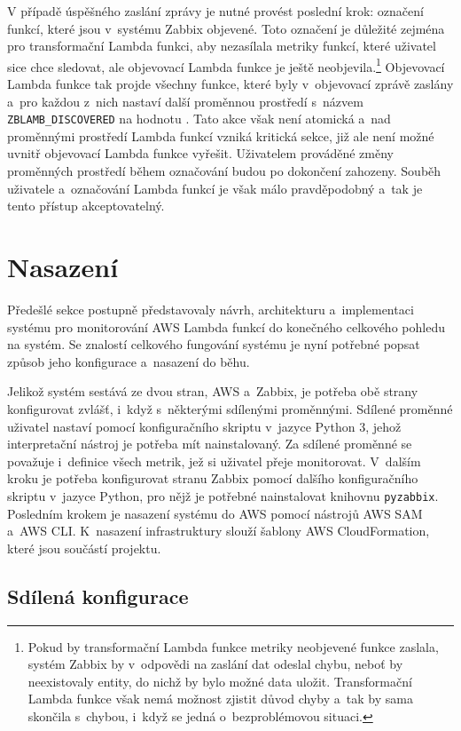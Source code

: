 \documentclass[czech, ing, kiv, he, iso690]{fasthesis}
\begin{document}
V případě úspěšného zaslání zprávy je nutné provést poslední krok: označení funkcí, které jsou v~systému Zabbix objevené. Toto označení je důležité zejména pro transformační Lambda funkci, aby nezasílala metriky funkcí, které uživatel sice chce sledovat, ale objevovací Lambda funkce je ještě neobjevila.\footnote{Pokud by transformační Lambda funkce metriky neobjevené funkce zaslala, systém Zabbix by v~odpovědi na zaslání dat odeslal chybu, neboť by neexistovaly entity, do nichž by bylo možné data uložit. Transformační Lambda funkce však nemá možnost zjistit důvod chyby a~tak by sama skončila s~chybou, i~když se jedná o~bezproblémovou situaci.} Objevovací Lambda funkce tak projde všechny funkce, které byly v~objevovací zprávě zaslány a~pro každou z~nich nastaví další proměnnou prostředí s~názvem \verb|ZBLAMB_DISCOVERED| na hodnotu . Tato akce však není atomická a~nad proměnnými prostředí Lambda funkcí vzniká kritická sekce, již ale není možné uvnitř objevovací Lambda funkce vyřešit. Uživatelem prováděné změny proměnných prostředí během označování budou po dokončení zahozeny. Souběh uživatele a~označování Lambda funkcí je však málo pravděpodobný a~tak je tento přístup akceptovatelný.

\section{Nasazení}
Předešlé sekce postupně představovaly návrh, architekturu a~implementaci systému pro monitorování AWS Lambda funkcí do konečného celkového pohledu na systém. Se znalostí celkového fungování systému je nyní potřebné popsat způsob jeho konfigurace a~nasazení do běhu.

Jelikož systém sestává ze dvou stran, AWS a~Zabbix, je potřeba obě strany konfigurovat zvlášť, i~když s~některými sdílenými proměnnými. Sdílené proměnné uživatel nastaví pomocí konfiguračního skriptu v~jazyce Python 3, jehož interpretační nástroj je potřeba mít nainstalovaný. Za sdílené proměnné se považuje i~definice všech metrik, jež si uživatel přeje monitorovat. V~dalším kroku je potřeba konfigurovat stranu Zabbix pomocí dalšího konfiguračního skriptu v~jazyce Python, pro nějž je potřebné nainstalovat knihovnu \verb|pyzabbix|. Posledním krokem je nasazení systému do AWS pomocí nástrojů AWS SAM a~AWS CLI. K~nasazení infrastruktury slouží šablony AWS CloudFormation, které jsou součástí projektu.

\subsection{Sdílená konfigurace}
\end{document}
